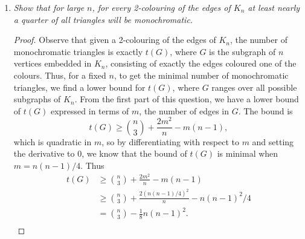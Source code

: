 \documentclass{article}
\begin{document}
\begin{enumerate}
\begin{enumerate}
\begin{proof}
          Summing the counts on each side of equation~\eqref{eqn:count},
          we get the desired formula. Then to get the inequality in the
          question, we equate it with equation~\eqref{eqn:count} and
          rearrange to get 
          \[\begin{array}{lrll}
            &t(G) &\geq \binom{n}{3} +\frac{2m^2}{n} -m(n-1) &\\
            \Leftrightarrow &\binom{n}{3} +\sum_{v\in V}\binom{d_v}{2} -mn
              +2m &\geq \binom{n}{3} +\frac{2m^2}{n} -m(n-1) &\\
            \Leftrightarrow &\sum_{v\in V}\binom{d_v}{2} &\geq
              \frac{2m^2}{n} -m &\\
            \Leftrightarrow &\frac{1}{2}\sum_{v\in V}d_v^2
              +\frac{1}{2}\sum_{v\in V}d_v &\geq \frac{2m^2}{n} -m
              &\because \binom{d_v}{2}=d_v(d_v-1)/2\\
            \Leftrightarrow &\sum_{v\in V}d_v^2 &\geq
              \frac{(2m)^2}{n} &\because \sum_{v\in V}d_v=2m\\
            \Leftrightarrow &\sum_{v\in V}d_v^2 &\geq
              \frac{\left(\sum_{v\in V}d_v \right)^2}{n}. &\because
              \sum_{v\in V}d_v=2m\\
          \end{array}\]

          Now the last line holds from the Cauchy-Schwarz inequality, so
          the proof is complete.
        \end{proof}

      \item \it Show that for large $n$, for every 2-colouring of the edges
        of $K_n$ at least nearly a quarter of all triangles will be
        monochromatic.

        \begin{proof}
          Observe that given a 2-colouring of the edges of $K_n$, the
          number of monochromatic triangles is exactly $t(G)$, where $G$ is
          the subgraph of $n$ vertices embedded in $K_n$, consisting of
          exactly the edges coloured one of the colours. Thus, for a fixed
          $n$, to get the minimal number of monochromatic triangles, we
          find a lower bound for $t(G)$, where $G$ ranges over all possible
          subgraphs of $K_n$. From the first part of this question, we have
          a lower bound of $t(G)$ expressed in terms of $m$, the number of
          edges in $G$. The bound is
          \[t(G) \geq \binom{n}{3} +\frac{2m^2}{n} -m(n-1),\]
          which is quadratic in $m$, so by differentiating with respect
          to $m$ and setting the derivative to 0, we know that the bound of
          $t(G)$ is minimal when $m=n(n-1)/4$. Thus
          \begin{align*}
            t(G) &\geq \binom{n}{3} +\frac{2m^2}{n} -m(n-1)\\
            &\geq \binom{n}{3} +\frac{2(n(n-1)/4)^2}{n} -n(n-1)^2/4\\
            &=\binom{n}{3} -\frac{1}{8}n(n-1)^2.\\
          \end{align*}


\end{proof}
\end{enumerate}
\end{enumerate}
\end{document}

